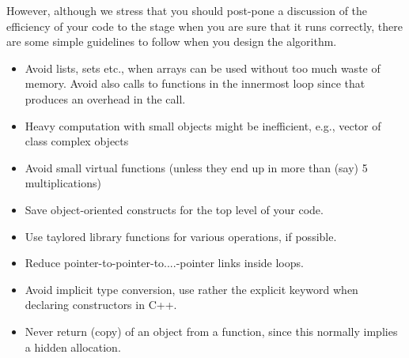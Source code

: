 However, although we stress that you should post-pone a discussion  of the efficiency of your code to the stage
when you are sure that it runs correctly, there are some simple guidelines to follow when you design the algorithm.
\begin{itemize}
\item Avoid lists, sets etc., when arrays can be used without too much waste
of memory. Avoid also calls to functions in the innermost loop since that produces an overhead in the call.
\item Heavy computation with small objects might be
inefficient, e.g., vector of class complex objects
\item Avoid small virtual functions (unless they end up in
more than (say) 5 multiplications)
\item Save object-oriented  constructs for the top level  of your code.
\item Use taylored library functions for various operations, if possible.
\item Reduce pointer-to-pointer-to....-pointer links
inside loops.
\item Avoid implicit type conversion, use rather  the explicit keyword when declaring constructors in C++.
\item Never return (copy) of an object from a function, since this normally implies a hidden allocation.
\end{itemize}






